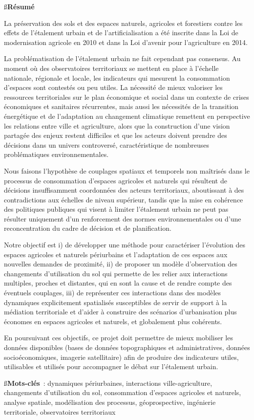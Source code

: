 {\ss\bf Résumé}

La préservation des sols et des espaces naturels, agricoles et forestiers
contre les effets de l'étalement urbain et de l'artificialisation
a été inscrite dans la Loi de modernisation agricole en 2010
et dans la Loi d'avenir pour l'agriculture en 2014.

La problématisation de l'étalement urbain ne fait cependant pas consensus.
Au moment où des observatoires territoriaux
se mettent en place à l'échelle nationale, régionale et locale,
les indicateurs qui mesurent la consommation d'espaces sont contestés ou peu utiles.
La nécessité de mieux valoriser les ressources territoriales sur le plan économique
et social dans un contexte de crises économiques et sanitaires récurrentes,
mais aussi les nécessités de la transition énergétique et de l'adaptation au changement climatique
remettent en perspective les relations entre ville et agriculture,
alors que la construction d'une vision partagée des enjeux restent difficiles
et que les acteurs doivent prendre des décisions dans un univers controversé,
caractéristique de nombreuses problématiques environnementales.

Nous faisons l'hypothèse de couplages spatiaux et temporels non maîtrisés dans le processus
de consommation d'espaces agricoles et naturels
qui résultent de décisions insuffisamment coordonnées des acteurs territoriaux,
aboutissant à des contradictions aux échelles de niveau supérieur,
tandis que la mise en cohérence des politiques publiques
qui visent à limiter l'étalement urbain ne peut pas résulter uniquement
d'un renforcement des normes environnementales ou d'une reconcentration
du cadre de décision et de planification.

Notre objectif est i) de développer une méthode pour caractériser
l'évolution des espaces agricoles et naturels périurbains et l'adaptation
de ces espaces aux nouvelles demandes de proximité,
ii) de proposer un modèle d'observation des changements d'utilisation du sol
qui permette de les relier aux interactions multiples, proches et distantes,
qui en sont la cause et de rendre compte des éventuels couplages,
iii) de représenter ces interactions dans des modèles dynamiques explicitement spatialisés
susceptibles de servir de support à la médiation territoriale 
et d'aider à construire des scénarios d'urbanisation
plus économes en espaces agricoles et naturels, et globalement plus cohérents.

En poursuivant ces objectifs,
ce projet doit permettre de mieux mobiliser les données disponibles
(bases de données topographiques et administratives, données socioéconomiques,
imagerie satellitaire) afin de produire des indicateurs
utiles, utilisables et utilisés pour accompagner le débat
sur l'étalement urbain.

\blank[2*big]

{\ss\bf Mots-clés} :
dynamiques périurbaines, interactions ville-agriculture,
changements d'utilisation du sol, consommation d'espaces agricoles et naturels,
analyse spatiale, modélisation des processus,
géoprospective, ingénierie territoriale, observatoires territoriaux